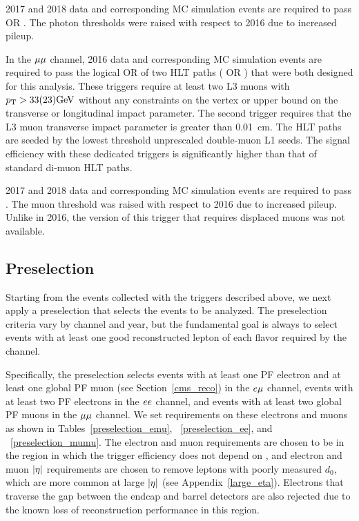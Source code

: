 2017 and 2018 data and corresponding MC simulation events are required to pass  OR  . The photon \ET thresholds were raised with respect to 2016 due to increased pileup.

In the ${\mu}{\mu}$ channel, 2016 data and corresponding MC simulation events are required to pass the logical OR of two HLT paths ( OR ) that were both designed for this analysis. These triggers require at least two L3 muons with $\pt>33(23)\si{\GeV}$ without any constraints on the vertex or upper bound on the transverse or longitudinal impact parameter. The second trigger requires that the L3 muon transverse impact parameter is greater than \SI{0.01}{\cm}. The HLT paths are seeded by the lowest \pt threshold unprescaled double-muon L1 seeds. The signal efficiency with these dedicated triggers is significantly higher than that of standard di-muon HLT paths.

2017 and 2018 data and corresponding MC simulation events are required to pass . The muon \pt threshold was raised with respect to 2016 due to increased pileup. Unlike in 2016, the version of this trigger that requires displaced muons was not available.

\subsection{Preselection}
\label{preselection}
Starting from the events collected with the triggers described above, we next apply a preselection that selects the events to be analyzed. The preselection criteria vary by channel and year, but the fundamental goal is always to select events with at least one good reconstructed lepton of each flavor required by the channel. 

Specifically, the preselection selects events with at least one PF electron and at least one global PF muon (see Section~\ref{cms_reco}) in the $e{\mu}$ channel, events with at least two PF electrons in the $ee$ channel, and events with at least two global PF muons in the ${\mu}{\mu}$ channel. We set requirements on these electrons and muons as shown in Tables~\ref{preselection_emu}, ~\ref{preselection_ee}, and ~\ref{preselection_mumu}. The electron and muon \pt  requirements are chosen to be in the region in which the trigger efficiency does not depend on \pt{}, and electron and muon $\lvert \eta \rvert$ requirements are chosen to remove leptons with poorly measured $d_0$, which are more common at large $\lvert \eta \rvert$ (see Appendix~\ref{large_eta}). Electrons that traverse the gap between the endcap and barrel detectors are also rejected due to the known loss of reconstruction performance in this region.

